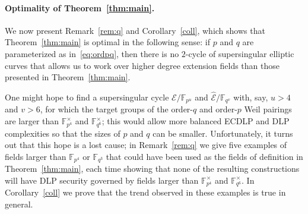 \documentclass[version=preprint]{iacrcc}
\newcommand{\F}{\mathbb{F}}
\newcommand{\EC}{\mathcal{E}}
\begin{document}
\paragraph{Optimality of Theorem~\ref{thm:main}.} We now present Remark~\ref{rem:q} and Corollary~\ref{coll}, which shows that Theorem~\ref{thm:main} is optimal in the following sense: if $p$ and $q$ are parameterized as in~\eqref{eq:ordpq}, then there is no $2$-cycle of supersingular elliptic curves that allows us to work over higher degree extension fields than those presented in Theorem~\ref{thm:main}. 

One might hope to find a supersingular cycle $\EC/\F_{p^u}$ and $\hat{\EC}/\F_{q^v}$ with, say, $u>4$ and $v>6$, for which the target groups of the order-$q$ and order-$p$ Weil pairings are larger than $\F_{p^4}^\times$ and $\F_{q^6}^\times$; this would allow more balanced ECDLP and DLP complexities so that the sizes of $p$ and $q$ can be smaller. Unfortunately, it turns out that this hope is a lost cause; in Remark~\ref{rem:q} we give five examples of fields larger than $\F_{p^4}$ or $\F_{q^3}$ that could have been used as the fields of definition in Theorem~\ref{thm:main}, each time showing that none of the resulting constructions will have DLP security governed by fields larger than $\F_{p^4}^\times$ and $\F_{q^6}^\times$. In Corollary~\ref{coll} we prove that the trend observed in these examples is true in general. 
\end{document}
